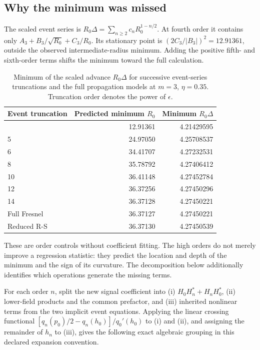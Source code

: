 \subsection{Why the minimum was
missed}\label{why-the-minimum-was-missed}

The scaled event series is \(R_0\Delta=\sum_{n\geq2}c_n R_0^{1-n/2}\).
At fourth order it contains only \(A_3+B_3/\sqrt{R_0}+C_3/R_0\). Its
stationary point is \((2C_3/|B_3|)^2=12.91361\), outside the observed
intermediate-radius minimum. Adding the positive fifth- and sixth-order
terms shifts the minimum toward the full calculation.

\begin{longtable}[]{@{}lrr@{}}
\caption{Minimum of the scaled advance $R_0\Delta$ for successive event-series truncations and the full propagation models at $m=3$, $\eta=0.35$. Truncation order denotes the power of $\epsilon$.}\label{tab:minimum-truncation}\\
\toprule\noalign{}
Event truncation & Predicted minimum \(R_0\) & Minimum \(R_0\Delta\) \\
\midrule\noalign{}
\endhead
\bottomrule\noalign{}
\endlastfoot
4 & 12.91361 & 4.21429595 \\
5 & 24.97050 & 4.25708537 \\
6 & 34.41707 & 4.27232531 \\
8 & 35.78792 & 4.27406412 \\
10 & 36.41148 & 4.27452784 \\
12 & 36.37256 & 4.27450296 \\
14 & 36.37128 & 4.27450221 \\
Full Fresnel & 36.37127 & 4.27450221 \\
Reduced R-S & 36.37130 & 4.27450539 \\
\end{longtable}

These are order controls without coefficient fitting. The high orders do
not merely improve a regression statistic: they predict the location and
depth of the minimum and the sign of its curvature. The decomposition
below additionally identifies which operations generate the missing
terms.

For each order \(n\), split the new signal coefficient into (i)
\(H_0H_n^*+H_nH_0^*\), (ii) lower-field products and the common
prefactor, and (iii) inherited nonlinear terms from the two implicit
event equations. Applying the linear crossing functional
\([q_n(p_0)/2-q_n(h_0)]/q_0'(h_0)\) to (i) and (ii), and assigning the
remainder of \(h_n\) to (iii), gives the following exact algebraic
grouping in this declared expansion convention.

